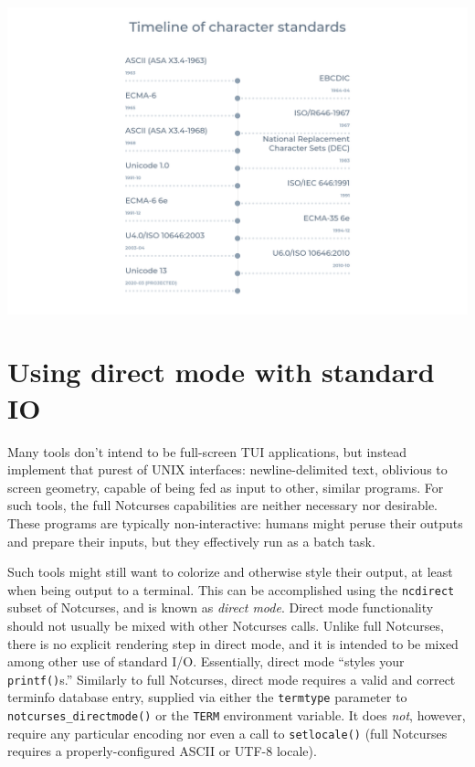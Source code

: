 \documentclass[letterpaper,10pt]{article}
\begin{document}
\begin{center}
\includegraphics[width=.9\linewidth]{media/charset-timeline.png}
\end{center}


\newpage

\section{Using direct mode with standard I\/O}

Many tools don't intend to be full-screen TUI applications, but instead
implement that purest of UNIX interfaces: newline-delimited text, oblivious
to screen geometry, capable of being fed as input to other, similar programs.
For such tools, the full Notcurses capabilities are neither necessary nor
desirable. These programs are typically non-interactive: humans might peruse
their outputs and prepare their inputs, but they effectively run as a batch
task.

 Such tools might still want to colorize and otherwise style their output, at
least when being output to a terminal. This can be accomplished using the
\texttt{ncdirect} subset of Notcurses, and is known as \textit{direct mode}. Direct
mode functionality should not usually be mixed with other Notcurses calls.
Unlike full Notcurses, there is no explicit rendering step in direct mode, and
it is intended to be mixed among other use of standard I/O. Essentially, direct
mode ``styles your \texttt{printf()}s.'' Similarly to full Notcurses, direct mode
requires a valid and correct terminfo database entry, supplied via either the
\texttt{termtype} parameter to \texttt{notcurses\_directmode()} or the \texttt{TERM} environment
variable. It does \textit{not}, however, require any particular encoding nor
even a call to \texttt{setlocale()} (full Notcurses requires a properly-configured
ASCII or UTF-8 locale).
\end{document}
